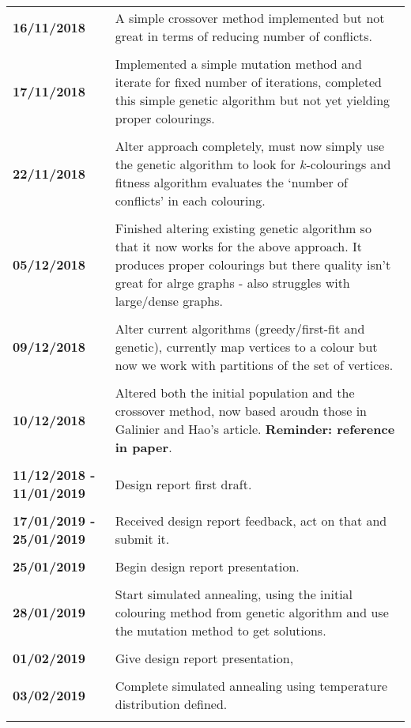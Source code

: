 \documentclass[12pt,a4paper]{article}
\begin{document}
\begin{longtable}{ p{} | p{} }
\textbf{16/11/2018} & A simple crossover method implemented but not great in terms of reducing number of conflicts. \\  \\  
\textbf{17/11/2018} & Implemented a simple mutation method and iterate for fixed number of iterations, completed this simple genetic algorithm but not yet yielding proper colourings. \\  \\
\textbf{22/11/2018} & Alter approach completely, must now simply use the genetic algorithm to look for $k$-colourings and fitness algorithm evaluates the `number of conflicts' in each colouring. \\  \\
\textbf{05/12/2018} & Finished altering existing genetic algorithm so that it now works for the above approach. It produces proper colourings but there quality isn't great for alrge graphs - also struggles with large/dense graphs. \\  \\
\textbf{09/12/2018} & Alter current algorithms (greedy/first-fit and genetic), currently map vertices to a colour  but now we work with partitions of the set of vertices. \\  \\
\textbf{10/12/2018} & Altered both the initial population and the crossover method, now based aroudn those in Galinier and Hao's article. \textbf{Reminder: reference in paper}. \\  \\
\textbf{11/12/2018 - 11/01/2019} & Design report first draft. \\  \\
\textbf{17/01/2019 - 25/01/2019} & Received design report feedback, act on that and submit it. \\  \\
\textbf{25/01/2019} & Begin design report presentation. \\  \\
\textbf{28/01/2019} & Start simulated annealing, using the initial colouring method from genetic algorithm and use the mutation method to get solutions. \\  \\
\textbf{01/02/2019} & Give design report presentation, \\ \\
\textbf{03/02/2019} & Complete simulated annealing using temperature distribution defined. \\ \\

\end{longtable}
\end{document}
